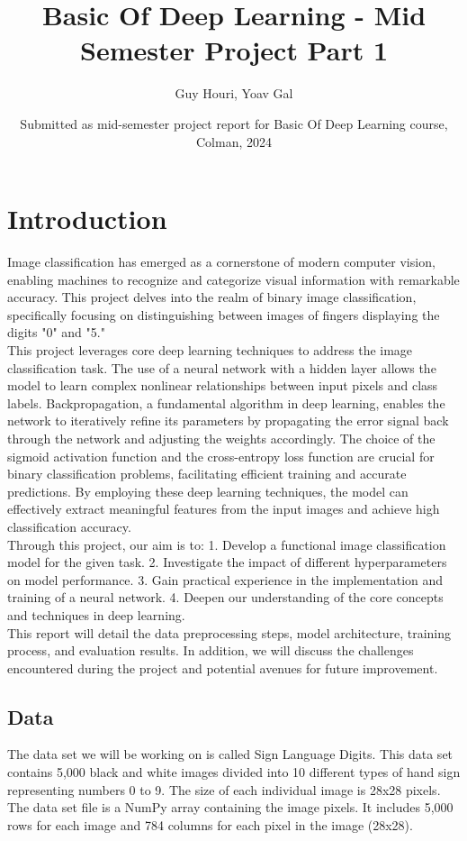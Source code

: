 \documentclass{article}
\title{Basic Of Deep Learning - Mid Semester Project Part 1}
\author{Guy Houri, Yoav Gal}
\date{Submitted as mid-semester project report for Basic Of Deep Learning course, Colman, 2024}
\begin{document}
\maketitle

\section{Introduction}

Image classification has emerged as a cornerstone of modern computer vision, enabling machines to recognize and categorize visual information with remarkable accuracy. This project delves into the realm of binary image classification, specifically focusing on distinguishing between images of fingers displaying the digits "0" and "5." \\

This project leverages core deep learning techniques to address the image classification task. The use of a neural network with a hidden layer allows the model to learn complex nonlinear relationships between input pixels and class labels. Backpropagation, a fundamental algorithm in deep learning, enables the network to iteratively refine its parameters by propagating the error signal back through the network and adjusting the weights accordingly. The choice of the sigmoid activation function and the cross-entropy loss function are crucial for binary classification problems, facilitating efficient training and accurate predictions. By employing these deep learning techniques, the model can effectively extract meaningful features from the input images and achieve high classification accuracy. \\

Through this project, our aim is to:
1.  Develop a functional image classification model for the given task.
2.  Investigate the impact of different hyperparameters on model performance.
3. Gain practical experience in the implementation and training of a neural network.
4.  Deepen our understanding of the core concepts and techniques in deep learning. \\

This report will detail the data preprocessing steps, model architecture, training process, and evaluation results. In addition, we will discuss the challenges encountered during the project and potential avenues for future improvement. 


\subsection{Data}
The data set we will be working on is called Sign Language Digits. This data set contains 5,000 black and white images divided into 10 different types of hand sign representing numbers 0 to 9. The size of each individual image is 28x28 pixels. The data set file is a NumPy array containing the image pixels. It includes 5,000 rows for each image and 784 columns for each pixel in the image (28x28).
\end{document}
